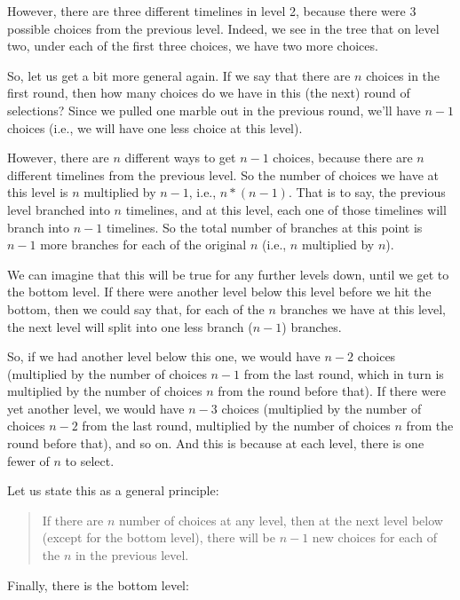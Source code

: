 \documentclass[../../../main.tex]{subfiles}
\begin{document}
However, there are three different timelines in level 2, because there were 3 possible choices from the previous level. Indeed, we see in the tree that on level two, under each of the first three choices, we have two more choices. 

So, let us get a bit more general again. If we say that there are $n$ choices in the first round, then how many choices do we have in this (the next) round of selections? Since we pulled one marble out in the previous round, we'll have $n - 1$ choices (i.e., we will have one less choice at this level). 

However, there are $n$ different ways to get $n - 1$ choices, because there are $n$ different timelines from the previous level. So the number of choices we have at this level is $n$ multiplied by $n - 1$, i.e., $n * (n - 1)$. That is to say, the previous level branched into $n$ timelines, and at this level, each one of those timelines will branch into $n - 1$ timelines. So the total number of branches at this point is $n - 1$ more branches for each of the original $n$ (i.e., $n$ multiplied by $n$).

We can imagine that this will be true for any further levels down, until we get to the bottom level. If there were another level below this level before we hit the bottom, then we could say that, for each of the $n$ branches we have at this level, the next level will split into one less branch ($n - 1$) branches.

So, if we had another level below this one, we would have $n - 2$ choices (multiplied by the number of choices $n - 1$ from the last round, which in turn is multiplied by the number of choices $n$ from the round before that). If there were yet another level, we would have $n - 3$ choices (multiplied by  the number of choices $n - 2$ from the last round, multiplied by the number of choices $n$ from the round before that), and so on. And this is because at each level, there is one fewer of $n$ to select.

Let us state this as a general principle:

\begin{quote}
  If there are $n$ number of choices at any level, then at the next level below (except for the bottom level), there will be $n -1$ new choices for each of the $n$ in the previous level.
\end{quote}

\noindent
Finally, there is the bottom level:
\end{document}

